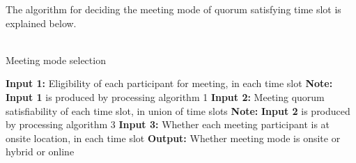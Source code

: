 The algorithm for deciding the meeting mode of quorum satisfying time slot is explained below.\\ \\
\begin{algorithm}[H]
    \caption{Meeting mode selection}
    \begin{algorithmic}[1]
        \State \textbf{Input 1:} Eligibility of each participant for meeting, in each time slot
        \State \textbf{Note:} \textbf{Input 1} is produced by processing algorithm 1
        \State \textbf{Input 2:} Meeting quorum satisfiability of each time slot, in union of time slots
        \State \textbf{Note:} \textbf{Input 2} is produced by processing algorithm 3
        \State \textbf{Input 3:} Whether each meeting participant is at onsite location, in each time slot
        \State \textbf{Output:} Whether meeting mode is onsite or hybrid or online \\


\end{algorithmic}
\end{algorithm}
